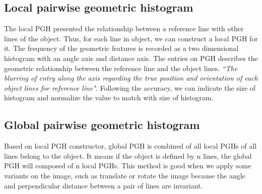 \subsection{Local pairwise geometric histogram}
The local PGH presented the relationship between a reference line with other lines of the object. Thus, for each line in object, we can construct a local PGH for it. The frequency of the geometric features is recorded as a two dimensional histogram with an angle axis and distance axis. The entries on PGH describes the geometric relationship between the reference line and the object lines. \textit{``The blurring of entry along the axis regarding the true position and orientation of each object lines for reference line"}\cite{palaniswamy2010automatic}. Following the accuracy, we can indicate the size of histogram and normalize the value to match with size of histogram.
\subsection{Global pairwise geometric histogram}
Based on local PGH constructor, global PGH is combined of all local PGHs of all lines belong to the object. It means if the object is defined by n lines, the global PGH will composed of n local PGHs. This method is good when we apply some variants on the image, such as translate or rotate the image because the angle and perpendicular distance between a pair of lines are invariant.
